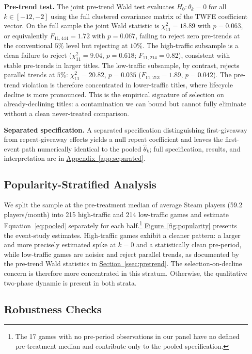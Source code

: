 \documentclass[11pt]{article}
\newcommand{\secref}[1]{\hyperref[#1]{Section~\ref*{#1}}}
\newcommand{\figref}[1]{\hyperref[#1]{Figure~\ref*{#1}}}
\newcommand{\appref}[1]{\hyperref[#1]{Appendix~\ref*{#1}}}
\begin{document}
\textbf{Pre-trend test.}\label{ssec:pretrend}
The joint pre-trend Wald test evaluates $H_0: \theta_k = 0$ for all
$k \in [-12, -2]$ using the full clustered covariance matrix of the TWFE
coefficient vector. On the full sample the joint Wald statistic is
$\chi^2_{11} = 18.89$ with $p = 0.063$, or equivalently $F_{11, 444} = 1.72$
with $p = 0.067$, failing to reject zero pre-trends at the conventional $5\%$
level but rejecting at $10\%$. The high-traffic subsample is a clean failure
to reject ($\chi^2_{11} = 9.04$, $p = 0.618$; $F_{11, 214} = 0.82$),
consistent with stable pre-trends in larger titles. The low-traffic subsample,
by contrast, rejects parallel trends at $5\%$: $\chi^2_{11} = 20.82$,
$p = 0.035$ ($F_{11, 213} = 1.89$, $p = 0.042$). The pre-trend violation is therefore concentrated in lower-traffic titles,
where lifecycle decline is more pronounced. This is the empirical signature
of selection on already-declining titles: a contamination we can bound but
cannot fully eliminate without a clean never-treated comparison.

\textbf{Separated specification.} A separated specification distinguishing
first-giveaway from repeat-giveaway effects yields a null repeat coefficient
and leaves the first-event path numerically identical to the pooled
$\hat{\theta}_k$; full specification, results, and interpretation are in
\appref{app:separated}.

\subsection{Popularity-Stratified Analysis}
\label{ssec:pop}

We split the sample at the pre-treatment median of average Steam players (59.2
players/month) into 215 high-traffic and 214 low-traffic games and estimate
Equation~\eqref{eq:pooled} separately for each half.\footnote{The 17 games
with no pre-period observations in our panel have no defined pre-treatment
median and contribute only to the pooled specification.}
\figref{fig:popularity} presents the event-study estimates. High-traffic
games exhibit a cleaner pattern: a larger and more precisely estimated spike
at $k = 0$ and a statistically clean pre-period, while low-traffic games are
noisier and reject parallel trends, as documented by the pre-trend Wald
statistics in \secref{ssec:pretrend}. The selection-on-decline concern
is therefore more concentrated in this stratum. Otherwise, the qualitative
two-phase dynamic is present in both strata.

\subsection{Robustness Checks}
\end{document}
